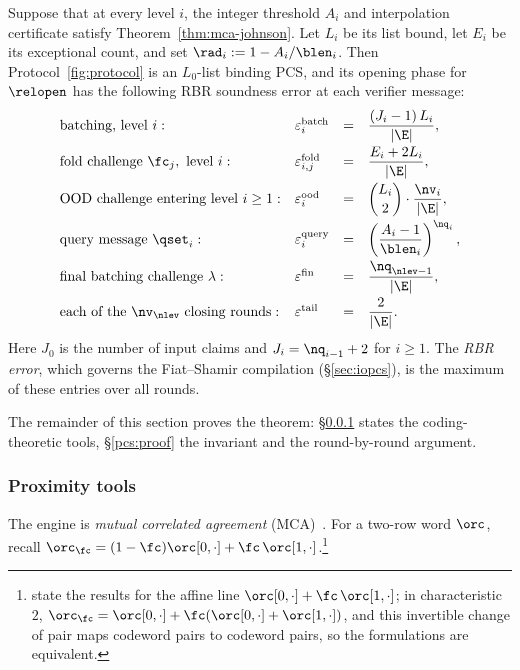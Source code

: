 \begin{theorem}\label{thm:rbr}
Suppose that at every level $i$, the integer threshold $A_i$ and interpolation certificate satisfy Theorem~\ref{thm:mca-johnson}. Let $L_i$ be its list bound, let $E_i$ be its exceptional count, and set $\rad_i:=1-A_i/\blen_i$. Then Protocol~\ref{fig:protocol} is an $L_0$-list binding PCS, and its opening phase for $\relopen$ has the following RBR soundness error at each verifier message:
\[
\begin{array}{llcl}
\textnormal{batching, level } i: & \varepsilon^{\mathrm{batch}}_i &=& \dfrac{(J_i - 1)\, L_i}{|\E|} , \\[2ex]
\textnormal{fold challenge } \fc_j, \textnormal{ level } i: & \varepsilon^{\mathrm{fold}}_{i,j} &=& \dfrac{E_i+2 L_i}{|\E|} , \\[2ex]
\textnormal{OOD challenge entering level } i \ge 1: & \varepsilon^{\mathrm{ood}}_i &=& \dbinom{L_i}{2} \cdot \dfrac{\nv_i}{|\E|} , \\[2ex]
\textnormal{query message } \qset_i: & \varepsilon^{\mathrm{query}}_i &=& \left(\dfrac{A_i-1}{\blen_i}\right)^{\nq_i} , \\[2ex]
\textnormal{final batching challenge } \lambda: & \varepsilon^{\mathrm{fin}} &=& \dfrac{\nq_{\nlev-1}}{|\E|} , \\[2ex]
\textnormal{each of the } \nv_\nlev \textnormal{ closing rounds}: & \varepsilon^{\mathrm{tail}} &=& \dfrac{2}{|\E|} .
\end{array}
\]
Here $J_0$ is the number of input claims and $J_i = \nq_{i-1} + 2$ for $i \ge 1$. The \emph{RBR error}, which governs the Fiat--Shamir compilation (\S\ref{sec:iopcs}), is the maximum of these entries over all rounds.
\end{theorem}

The remainder of this section proves the theorem: \S\ref{sec:tools} states the coding-theoretic tools, \S\ref{pcs:proof} the invariant and the round-by-round argument.

\subsubsection{Proximity tools}\label{sec:tools}

The engine is \emph{mutual correlated agreement} (MCA)~\cite{ACFY25}. For a two-row word $\orc$, recall $\orc_\fc = (1-\fc)\orc[0,\cdot] + \fc\,\orc[1,\cdot]$.\footnote{\cite{BCHKS25} state the results for the affine line $\orc[0,\cdot] + \fc\,\orc[1,\cdot]$; in characteristic $2$, $\orc_\fc = \orc[0,\cdot] + \fc(\orc[0,\cdot] + \orc[1,\cdot])$, and this invertible change of pair maps codeword pairs to codeword pairs, so the formulations are equivalent.}

